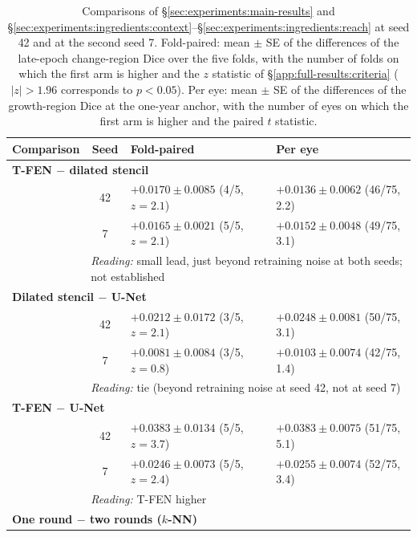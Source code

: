 \clearpage
\begin{table}[!h]
  \centering
  \caption[Comparisons at both seeds, part 1.]{%
    Comparisons of \S\ref{sec:experiments:main-results} and
    \S\ref{sec:experiments:ingredients:context}--\S\ref{sec:experiments:ingredients:reach}
    at seed 42 and at the second seed 7. Fold-paired: mean $\pm$ SE of the
    differences of the late-epoch change-region Dice over the five folds,
    with the number of folds on which the first arm is higher and the
    $z$ statistic of \S\ref{app:full-results:criteria} ($|z| > 1.96$
    corresponds to $p < 0.05$). Per eye:
    mean $\pm$ SE of the differences of the growth-region Dice at the
    one-year anchor, with the number of eyes on which the first arm is higher and
    the paired $t$ statistic.}
  \label{tab:appendix:seeds}
  \footnotesize
  \begin{tabular}{l c l l}
    \toprule
    Comparison & Seed & Fold-paired & Per eye \\
    \midrule
    \multicolumn{4}{l}{\textbf{T-FEN $-$ dilated stencil}} \\
    & 42 & $+0.0170 \pm 0.0085$ (4/5, $z = 2.1$) & $+0.0136 \pm 0.0062$ (46/75, 2.2) \\
    & 7  & $+0.0165 \pm 0.0021$ (5/5, $z = 2.1$) & $+0.0152 \pm 0.0048$ (49/75, 3.1) \\
    & \multicolumn{3}{l}{\emph{Reading:} small lead, just beyond retraining
      noise at both seeds; not established} \\[2pt]
    \multicolumn{4}{l}{\textbf{Dilated stencil $-$ U-Net}} \\
    & 42 & $+0.0212 \pm 0.0172$ (3/5, $z = 2.1$) & $+0.0248 \pm 0.0081$ (50/75, 3.1) \\
    & 7  & $+0.0081 \pm 0.0084$ (3/5, $z = 0.8$) & $+0.0103 \pm 0.0074$ (42/75, 1.4) \\
    & \multicolumn{3}{l}{\emph{Reading:} tie (beyond retraining noise at
      seed 42, not at seed 7)} \\[2pt]
    \multicolumn{4}{l}{\textbf{T-FEN $-$ U-Net}} \\
    & 42 & $+0.0383 \pm 0.0134$ (5/5, $z = 3.7$) & $+0.0383 \pm 0.0075$ (51/75, 5.1) \\
    & 7  & $+0.0246 \pm 0.0073$ (5/5, $z = 2.4$) & $+0.0255 \pm 0.0074$ (52/75, 3.4) \\
    & \multicolumn{3}{l}{\emph{Reading:} T-FEN higher} \\[2pt]
    \multicolumn{4}{l}{\textbf{One round $-$ two rounds ($k$-NN)}} \\

\end{tabular}
\end{table}
